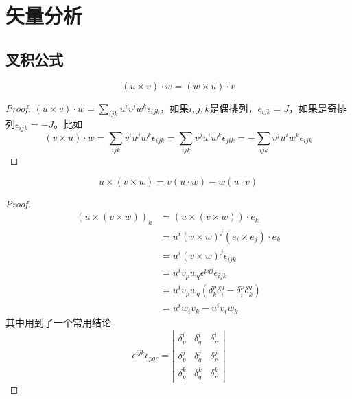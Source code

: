 \documentclass{mynote}
\begin{document}
\section{矢量分析}
\subsection{叉积公式}
\begin{proposition}
    \[
    (u \times v)\cdot w = (w \times u)\cdot v
    \]
\end{proposition}
\begin{proof}
    $(u\times v) \cdot w = \sum\limits_{ijk}u^i v^j w^k \epsilon_{ijk}$，如果$i,j,k$是偶排列，$\epsilon_{ijk} = J$，如果是奇排列$\epsilon_{ijk} = -J$。比如
    \[
        (v\times u) \cdot w = \sum\limits_{ijk}v^i u^j w^k \epsilon_{ijk}  =  \sum\limits_{ijk}v^j u^i w^k \epsilon_{jik} = -\sum\limits_{ijk}v^j u^i w^k \epsilon_{ijk}
    \]
\end{proof}



\begin{proposition}
    \[
    u \times (v \times w) = v (u \cdot w) - w(u \cdot v)    
    \]
\end{proposition}
\begin{proof}
    \begin{align*}
        (u \times (v \times w))_k &= (u \times (v \times w)) \cdot e_k \\
        &= u^i (v \times w)^j (e_i \times e_j) \cdot e_k \\
        &= u^i (v \times w)^j \epsilon_{ijk} \\
        &= u^i v_p w_q \epsilon^{pqj} \epsilon_{ijk} \\
        &= u^i v_p w_q (\delta^p_k \delta^q_i - \delta^p_i \delta^q_k) \\
        &= u^i w_i v_k - u^i v_i w_k
    \end{align*}
    其中用到了一个常用结论
    \[
    \epsilon^{ijk}\epsilon_{pqr} = 
    \left|
        \begin{matrix}
            \delta^i_p  & \delta^i_q & \delta^i_r \\
            \delta^j_p & \delta^j_q & \delta^j_r \\
            \delta^k_p & \delta^k_q & \delta^k_r
        \end{matrix}
    \right|
    \]
\end{proof}
\end{document}
